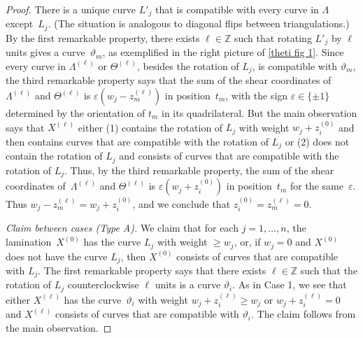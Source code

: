 \documentclass{amsart}
\theoremstyle{definition}
\theoremstyle{remark}
\numberwithin{equation}{section}
\newcommand{\integers}{\mathbb Z}
\newcommand{\ep}{\varepsilon}
\newcommand{\thet}{\vartheta}
\newcommand{\set}[1]{{\lbrace #1 \rbrace}}
\newcommand{\0}{{\mathbf{0}}}
\renewcommand{\L}{\mathcal{L}}
\begin{document}
\begin{proof}
There is a unique curve $L'_j$ that is compatible with every curve in $\Lambda$ except~$L_j$. 
(The situation is analogous to diagonal flips between triangulations.)
By the first remarkable property, there exists $\ell\in\integers$ such that rotating $L'_j$ by $\ell$ units gives a curve~$\thet_m$, as exemplified in the right picture of \cref{theti fig 1}.
Since every curve in $\Lambda^{(\ell)}$ or $\Theta^{(\ell)}$, besides the rotation of $L_j$, is compatible with $\thet_m$, the third remarkable property says that the sum of the shear coordinates of $\Lambda^{(\ell)}$ and $\Theta^{(\ell)}$ is ${\ep(w_j-z_m^{(\ell)})}$ in position~$t_m$, with the sign $\ep\in\set{\pm1}$ determined by the orientation of $t_m$ in its quadrilateral.
But the main observation says that $X^{(\ell)}$ either (1) contains the rotation of $L_j$ with weight $w_j+z_i^{(0)}$ and then contains curves that are compatible with the rotation of $L_j$ or (2) does not contain the rotation of $L_j$ and consists of curves that are compatible with the rotation of $L_j$.
Thus, by the third remarkable property, the sum of the shear coordinates of~$\Lambda^{(\ell)}$ and $\Theta^{(\ell)}$ is $\ep(w_j+z_i^{(0)})$ in position~$t_m$ for the same~$\ep$.
Thus $w_j-z_m^{(\ell)}=w_j+z_i^{(0)}$, and we conclude that $z_i^{(0)}=z_m^{(\ell)}=0$.

\smallskip

\noindent
\textit{Claim between cases (Type A).}
We claim that for each $j=1,\ldots,n$, the lamination~$X^{(0)}$ has the curve $L_j$ with weight $\ge w_j$, or, if $w_j=0$ and $X^{(0)}$ does not have the curve $L_j$, then $X^{(0)}$ consists of curves that are compatible with $L_j$.
The first remarkable property says that there exists $\ell\in\integers$ such that the rotation of $L_j$ counterclockwise $\ell$ units is a curve $\thet_i$.
As in Case 1, we see that either $X^{(\ell)}$ has the curve~$\thet_i$ with weight $w_j+z_i^{(\ell)}\ge w_j$ or $w_j+z_i^{(\ell)}=0$ and $X^{(\ell)}$ consists of curves that are compatible with $\thet_i$.
The claim follows from the main observation.

\smallskip


\end{proof}
\end{document}
